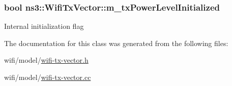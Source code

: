 \subsubsection[{\texorpdfstring{m\+\_\+tx\+Power\+Level\+Initialized}{m_txPowerLevelInitialized}}]{\setlength{\rightskip}{0pt plus 5cm}bool ns3\+::\+Wifi\+Tx\+Vector\+::m\+\_\+tx\+Power\+Level\+Initialized\hspace{0.3cm}{\ttfamily [private]}}\hypertarget{classns3_1_1WifiTxVector_a44a71d5caa2888c951d0b487a9e79145}{}\label{classns3_1_1WifiTxVector_a44a71d5caa2888c951d0b487a9e79145}
Internal initialization flag 

The documentation for this class was generated from the following files\+:\begin{DoxyCompactItemize}
\item 
wifi/model/\hyperlink{wifi-tx-vector_8h}{wifi-\/tx-\/vector.\+h}\item 
wifi/model/\hyperlink{wifi-tx-vector_8cc}{wifi-\/tx-\/vector.\+cc}\end{DoxyCompactItemize}
